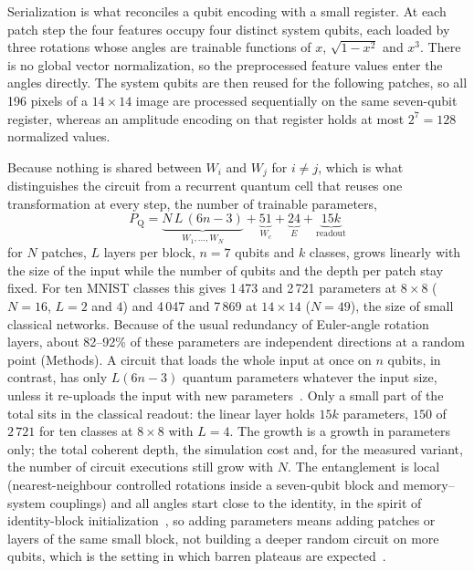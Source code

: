 \documentclass[11pt]{article}
\begin{document}
Serialization is what reconciles a qubit encoding with a small register. At each patch step the four features occupy four distinct system qubits, each loaded by three rotations whose angles are trainable functions of $x$, $\sqrt{1-x^2}$ and $x^3$. There is no global vector normalization, so the preprocessed feature values enter the angles directly. The system qubits are then reused for the following patches, so all 196 pixels of a $14\times14$ image are processed sequentially on the same seven-qubit register, whereas an amplitude encoding on that register holds at most $2^7=128$ normalized values.

Because nothing is shared between $W_i$ and $W_j$ for $i\neq j$, which is what distinguishes the circuit from a recurrent quantum cell that reuses one transformation at every step, the number of trainable parameters,
\begin{equation}
  P_{\mathrm{Q}} = \underbrace{N\,L\,(6n-3)}_{W_1,\dots,W_N}+\underbrace{51}_{W_c}+\underbrace{24}_{E}+\underbrace{15k}_{\text{readout}}
  \label{eq:params}
\end{equation}
for $N$ patches, $L$ layers per block, $n=7$ qubits and $k$ classes, grows linearly with the size of the input while the number of qubits and the depth per patch stay fixed. For ten MNIST classes this gives 1\,473 and 2\,721 parameters at $8\times8$ ($N=16$, $L=2$ and $4$) and 4\,047 and 7\,869 at $14\times14$ ($N=49$), the size of small classical networks. Because of the usual redundancy of Euler-angle rotation layers, about 82--92\% of these parameters are independent directions at a random point (Methods). A circuit that loads the whole input at once on $n$ qubits, in contrast, has only $L(6n-3)$ quantum parameters whatever the input size, unless it re-uploads the input with new parameters~\cite{perezsalinas2020reuploading}. Only a small part of the total sits in the classical readout: the linear layer holds $15k$ parameters, $150$ of $2\,721$ for ten classes at $8\times8$ with $L=4$. The growth is a growth in parameters only; the total coherent depth, the simulation cost and, for the measured variant, the number of circuit executions still grow with $N$. The entanglement is local (nearest-neighbour controlled rotations inside a seven-qubit block and memory--system couplings) and all angles start close to the identity, in the spirit of identity-block initialization~\cite{grant2019initialization}, so adding parameters means adding patches or layers of the same small block, not building a deeper random circuit on more qubits, which is the setting in which barren plateaus are expected~\cite{mcclean2018barren}.
\end{document}
